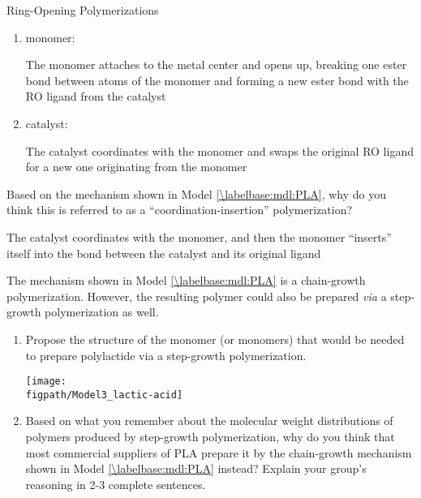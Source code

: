\begin{activity}{Ring-Opening Polymerizations}
\begin{ctqs}
		\begin{enumerate}
			\item monomer:
			
				\begin{solution}[0.5in]{}
					The monomer attaches to the metal center and opens up, breaking one ester bond between atoms of the monomer and forming a new ester bond with the RO ligand from the catalyst
				\end{solution}
			
			\item catalyst:
			
				\begin{solution}[0.5in]{}
					The catalyst coordinates with the monomer and swaps the original RO ligand for a new one originating from the monomer
				\end{solution}
				
		\end{enumerate}
		
	\question Based on the mechanism shown in Model \ref{\labelbase:mdl:PLA}, why do you think this is referred to as a ``coordination-insertion'' polymerization?
			
				\begin{solution}[1in]{}
					The catalyst coordinates with the monomer, and then the monomer ``inserts'' itself into the bond between the catalyst and its original ligand
				\end{solution}
	
	\question The mechanism shown in Model \ref{\labelbase:mdl:PLA} is a chain-growth polymerization.  However, the resulting polymer could also be prepared \emph{via} a step-growth polymerization as well.
	
		\begin{enumerate}
			\item Propose the structure of the monomer (or monomers) that would be needed to prepare polylactide via a step-growth polymerization.
			
				\begin{solution}[1in]{}
					\centerline{\texttt{[image: \\figpath/Model3\_lactic-acid]}}
				\end{solution}
			
			\item Based on what you remember about the molecular weight distributions of polymers produced by step-growth polymerization, why do you think that most commercial suppliers of PLA prepare it by the chain-growth mechanism shown in Model \ref{\labelbase:mdl:PLA} instead?  Explain your group's reasoning in 2-3 complete sentences.
			

\end{enumerate}
\end{ctqs}
\end{activity}
